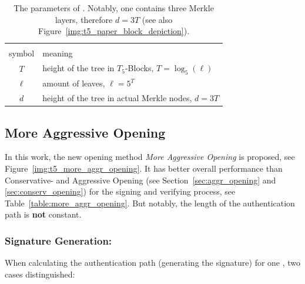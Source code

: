 \begin{table}
\centering
\begin{tabular}{c l}
 \hline\noalign{\smallskip}
 \multicolumn{2}{c}{\textbf{\extree Parameter}} \\
 symbol & meaning \\
 \hline\noalign{\smallskip} 
 $T$ & height of the tree in $T_5$-Blocks, $T = \log_5(\ell)$ \\
  $\ell$ & amount of leaves, $\ell = 5^T$ \\
 $d$ & height of the tree in actual Merkle nodes, $d = 3T$ \\
 \hline
\end{tabular}
\caption{The parameters of \extree. Notably, one \tfblock contains three Merkle layers, therefore $d=3T$ (see also Figure~\ref{img:t5_paper_block_depiction}).} %
\label{table:t5_ext_parameter}
\end{table}

\subsection{More Aggressive Opening}
\label{sec:more_aggr_opening}
In this work, the new opening method \textit{More Aggressive Opening} is proposed, see Figure~\ref{img:t5_more_aggr_opening}. It has better overall performance than Conservative- and Aggressive Opening (see Section~\ref{sec:aggr_opening} and \ref{sec:conserv_opening}) for the signing and verifying process, see Table~\ref{table:more_aggr_opening}. But notably, the length of the authentication path is \textbf{not} constant.

\subsubsection{Signature Generation: \texorpdfstring{\tfblock}{T5-Block}}
When calculating the authentication path (generating the signature) for one \tfblock, two cases distinguished:

